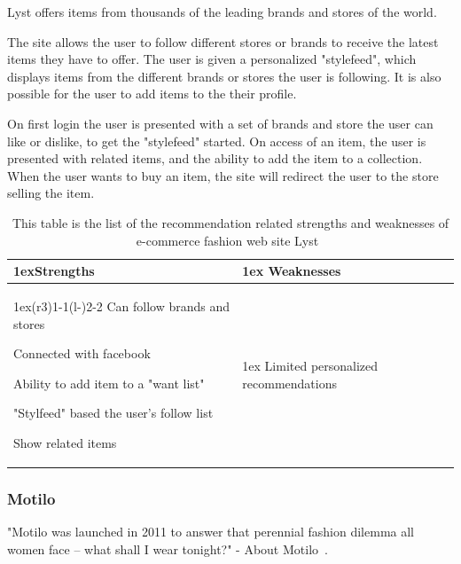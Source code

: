     Lyst offers items from thousands of the leading brands and stores of the world.

    The site allows the user to follow different stores or brands to receive the latest items they have to offer.
    The user is given a personalized "stylefeed", which displays items from the different brands or stores the user is following.
    It is also possible for the user to add items to the their profile.

    On first login the user is presented with a set of brands and store the user can like or dislike, to get the "stylefeed" started.
    On access of an item, the user is presented with related items, and the ability to add the item to a collection.
    When the user wants to buy an item, the site will redirect the user to the store selling the item.
    
    \begin{table}[H]
    	\centering
        \begin{tabularx}{\linewidth}{>{\parskip1ex}X@{\kern4\tabcolsep}>{\parskip1ex}X}
        \toprule
        	\hfil\bfseries Strengths
            &
            \hfil\bfseries Weaknesses
            \\\cmidrule(r{3\tabcolsep}){1-1}\cmidrule(l{-\tabcolsep}){2-2}
                    Can follow brands and stores \par
                    Connected with facebook \par
                    Ability to add item to a "want list" \par
                    "Stylfeed" based the user's follow list \par
                    Show related items \par
                    &
                    Limited personalized recommendations \par
                    \\\bottomrule 
                \end{tabularx}
        \caption[Recommendation related strengths and weaknesses of Lyst~\cite{lyst}]{This table is the list of the recommendation related strengths and weaknesses of e-commerce fashion web site Lyst~\cite{lyst}}
        \label{table:ecommenreceLyst}
    \end{table}

\subsubsection{Motilo} %
\label{par:motilo}
    "Motilo was launched in 2011 to answer that perennial fashion dilemma all women face – what shall I wear tonight?" - About Motilo~\cite{motilo}.

